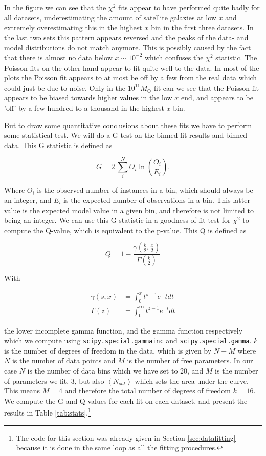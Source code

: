 In the figure we can see that the $\chi^2$ fits appear to have performed quite badly for all datasets, underestimating the amount of satellite galaxies at low $x$ and extremely overestimating this in the highest $x$ bin in the first three datasets. In the last two sets this pattern appears reversed and the peaks of the data- and model distributions do not match anymore. This is possibly caused by the fact that there is almost no data below $x \sim 10^{-2}$ which confuses the $\chi^2$ statistic. The Poisson fits on the other hand appear to fit quite well to the data. In most of the plots the Poisson fit appears to at most be off by a few from the real data which could just be due to noise. Only in the $10^{11} M_{\odot}$ fit can we see that the Poisson fit appears to be biased towards higher values in the low $x$ end, and appears to be 'off' by a few hundred to a thousand in the highest $x$ bin. 



But to draw some quantitative conclusions about these fits we have to perform some statistical test. We will do a G-test on the binned fit results and binned data. This G statistic is defined as

\begin{equation}
    G = 2~\sum_i^N O_i\ln\left(\frac{O_i}{E_i}\right)\label{eq:G}.
\end{equation}

Where $O_i$ is the observed number of instances in a bin, which should always be an integer, and $E_i$ is the expected number of observations in a bin. This latter value is the expected model value in a given bin, and therefore is not limited to being an integer. We can use this G statistic in a goodness of fit test for $\chi^2$ to compute the Q-value, which is equivalent to the p-value. This Q is defined as

\begin{equation}
    Q = 1 - \frac{\gamma\left(\frac{k}{2},\frac{x}{2}\right)}{\Gamma\left(\frac{k}{2}\right)}\label{eq:Q}
\end{equation}

With 

\begin{align}
    \gamma(s, x) &= \int_0^x t^{s-1}e^-t dt \\
    \Gamma(z) &= \int_0^{\infty} t^{z-1}e^{-t}dt
\end{align}

the lower incomplete gamma function, and the gamma function respectively which we compute using \texttt{scipy.special.gammainc} and \texttt{scipy.special.gamma}. $k$ is the number of degrees of freedom in the data, which is given by $N - M$ where $N$ is the number of data points and $M$ is the number of free parameters. In our case $N$ is the number of data bins which we have set to $20$, and $M$ is the number of parameters we fit, 3, but also $\left<N_{sat}\right>$ which sets the area under the curve. This means $M=4$ and therefore the total number of degrees of freedom $k = 16$. We compute the G and Q values for each fit on each dataset, and present the results in Table \ref{tab:stats}.\footnote{The code for this section was already given in Section \ref{sec:datafitting} because it is done in the same loop as all the fitting procedures.}

